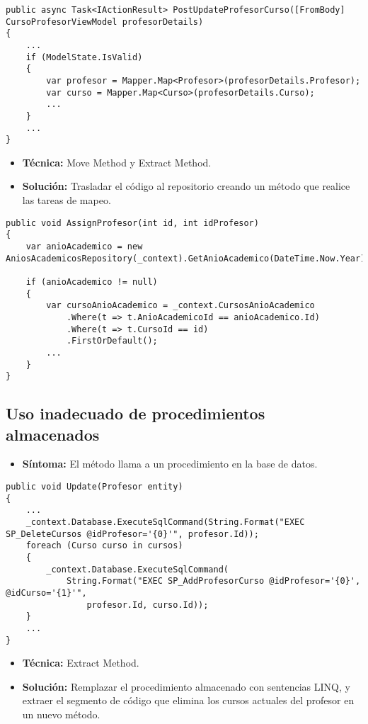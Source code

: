 \begin{lstlisting}[language={[Sharp]C}]
public async Task<IActionResult> PostUpdateProfesorCurso([FromBody] CursoProfesorViewModel profesorDetails)
{
	...
	if (ModelState.IsValid)
	{
		var profesor = Mapper.Map<Profesor>(profesorDetails.Profesor);
		var curso = Mapper.Map<Curso>(profesorDetails.Curso);
		...
	}
	...
}
\end{lstlisting}

\begin{itemize}
	\item \textbf{Técnica:} Move Method y Extract Method.
	\item \textbf{Solución:} Trasladar el código al repositorio creando un método que realice las tareas de mapeo.
\end{itemize}

\begin{lstlisting}[language={[Sharp]C}]
public void AssignProfesor(int id, int idProfesor)
{
	var anioAcademico = new AniosAcademicosRepository(_context).GetAnioAcademico(DateTime.Now.Year);

	if (anioAcademico != null)
	{
		var cursoAnioAcademico = _context.CursosAnioAcademico
			.Where(t => t.AnioAcademicoId == anioAcademico.Id)
			.Where(t => t.CursoId == id)
			.FirstOrDefault();	
		...
	}
}
\end{lstlisting}


\subsection{Uso inadecuado de procedimientos almacenados}
\begin{itemize}
	\item \textbf{Síntoma:} El método llama a un procedimiento en la base de datos.
\end{itemize}

\begin{lstlisting}[language={[Sharp]C}]
public void Update(Profesor entity)
{
	...
	_context.Database.ExecuteSqlCommand(String.Format("EXEC SP_DeleteCursos @idProfesor='{0}'", profesor.Id));
	foreach (Curso curso in cursos)
	{
    	_context.Database.ExecuteSqlCommand(
    		String.Format("EXEC SP_AddProfesorCurso @idProfesor='{0}', @idCurso='{1}'", 
    			profesor.Id, curso.Id));
	}
	...
}
\end{lstlisting}

\begin{itemize}
	\item \textbf{Técnica:} Extract Method.
	\item \textbf{Solución:} Remplazar el procedimiento almacenado con sentencias LINQ, y extraer el segmento de código que elimina los cursos actuales del profesor en un nuevo método.
\end{itemize}

